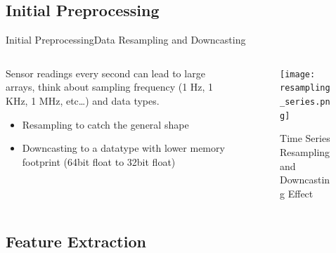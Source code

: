 \documentclass{beamer}
\begin{document}
        \subsection{Initial Preprocessing}

            \begin{frame}{Initial Preprocessing}{Data Resampling and Downcasting}
                \begin{columns}
                    \begin{column}{0.45\textwidth}
                        Sensor readings every second can lead to large arrays, think about sampling frequency (1 Hz, 1 KHz, 1 MHz, etc\dots) and data types.
                        \begin{itemize}
                            \item Resampling to catch the general shape
                            \item Downcasting to a datatype with lower memory footprint (64bit float to 32bit float)
                        \end{itemize}
                    \end{column}
                    \begin{column}{0.5\textwidth}
                        \begin{figure}[!htbp]
                            \centering
                            \texttt{[image: resampling\_series.png]}
                            \caption{Time Series Resampling and Downcasting Effect}
                        \end{figure}
                    \end{column}
                \end{columns}
            \end{frame}

        \subsection{Feature Extraction}
\end{document}
